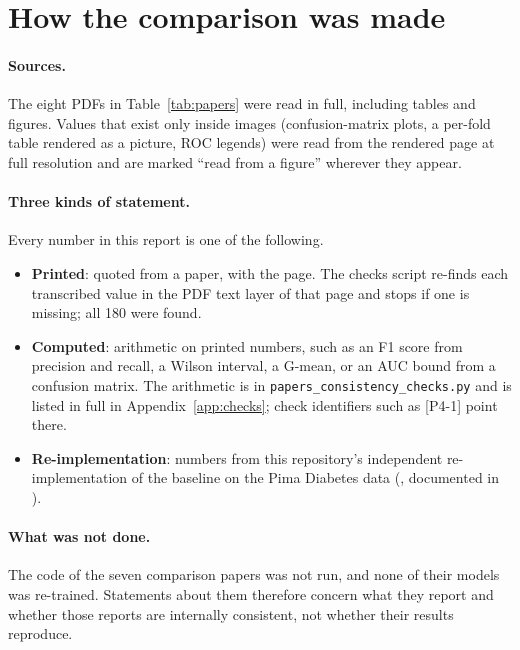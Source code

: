 \documentclass[11pt,a4paper]{article}
\newcommand{\code}[1]{\texttt{\small #1}}
\newcommand{\chk}[1]{\textsf{\small [#1]}}
\begin{document}
\tableofcontents
\clearpage

\section{How the comparison was made}
\label{sec:rules}
\paragraph{Sources.} The eight PDFs in Table~\ref{tab:papers} were read in full, including tables and figures. Values that exist only inside images (confusion-matrix plots, a per-fold table rendered as a picture, ROC legends) were read from the rendered page at full resolution and are marked ``read from a figure'' wherever they appear.

\paragraph{Three kinds of statement.} Every number in this report is one of the following.
\begin{itemize}
  \item \textbf{Printed}: quoted from a paper, with the page. The checks script re-finds each transcribed value in the PDF text layer of that page and stops if one is missing; all 180 were found.
  \item \textbf{Computed}: arithmetic on printed numbers, such as an F1 score from precision and recall, a Wilson interval, a G-mean, or an AUC bound from a confusion matrix. The arithmetic is in \code{papers\_consistency\_checks.py} and is listed in full in Appendix~\ref{app:checks}; check identifiers such as \chk{P4-1} point there.
  \item \textbf{Re-implementation}: numbers from this repository's independent re-implementation of the baseline on the Pima Diabetes data (, documented in ).
\end{itemize}

\paragraph{What was not done.} The code of the seven comparison papers was not run, and none of their models was re-trained. Statements about them therefore concern what they report and whether those reports are internally consistent, not whether their results reproduce.
\end{document}
